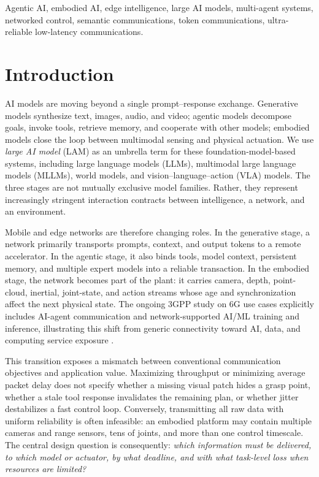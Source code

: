\documentclass[letterpaper,journal]{IEEEtran}
\newcommand{\LAM}{large AI model}
\begin{document}
\begin{IEEEkeywords}
Agentic AI, embodied AI, edge intelligence, large AI models, multi-agent
systems, networked control, semantic communications, token communications,
ultra-reliable low-latency communications.
\end{IEEEkeywords}

\section{Introduction}
\label{sec:introduction}
 AI models are moving beyond a single prompt--response
exchange. Generative models synthesize text, images, audio, and video;
agentic models decompose goals, invoke tools, retrieve memory, and cooperate
with other models; embodied models close the loop between multimodal sensing
and physical actuation. We use \emph{\LAM} (LAM) as an umbrella term for these
foundation-model-based systems, including large language models (LLMs),
multimodal large language models (MLLMs), world models, and
vision--language--action (VLA) models. The three stages are not mutually
exclusive model families. Rather, they represent increasingly stringent
interaction contracts between intelligence, a network, and an environment.

Mobile and edge networks are therefore changing roles. In the generative
stage, a network primarily transports prompts, context, and output tokens to a
remote accelerator. In the agentic stage, it also binds tools, model context,
persistent memory, and multiple expert models into a reliable transaction.
In the embodied stage, the network becomes part of the plant: it carries
camera, depth, point-cloud, inertial, joint-state, and action streams whose age
and synchronization affect the next physical state. The ongoing 3GPP study on
6G use cases explicitly includes AI-agent communication and network-supported
AI/ML training and inference, illustrating this shift from generic
connectivity toward AI, data, and computing service exposure
\cite{3gpp22870}.

This transition exposes a mismatch between conventional communication
objectives and application value. Maximizing throughput or minimizing average
packet delay does not specify whether a missing visual patch hides a grasp
point, whether a stale tool response invalidates the remaining plan, or
whether jitter destabilizes a fast control loop. Conversely, transmitting all
raw data with uniform reliability is often infeasible: an embodied platform
may contain multiple cameras and range sensors, tens of joints, and more than
one control timescale. The central design question is consequently:
\emph{which information must be delivered, to which model or actuator, by
what deadline, and with what task-level loss when resources are limited?}
\end{document}
